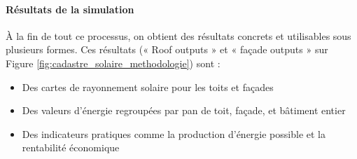 \paragraph{Résultats de la simulation}
\par{À la fin de tout ce processus, on obtient des résultats concrets et utilisables sous plusieurs formes. Ces résultats (« Roof outputs » et « façade outputs » sur Figure \ref{fig:cadastre_solaire_methodologie}) sont :
\begin{itemize}
\item Des cartes de rayonnement solaire pour les toits et façades
\item Des valeurs d'énergie regroupées par pan de toit, façade, et bâtiment entier
\item Des indicateurs pratiques comme la production d'énergie possible et la rentabilité économique
\end{itemize}}

